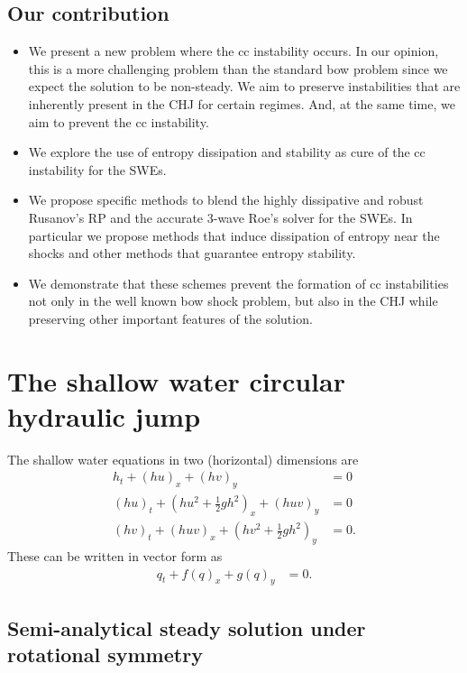 \documentclass[preprint, 11pt]{article}
\begin{document}
\subsection{Our contribution}
\begin{itemize}
\item We present a new problem where the cc instability occurs. In our opinion, this is a more challenging 
  problem than the standard bow problem since we expect the solution to be non-steady. 
  We aim to preserve instabilities that are inherently present in the CHJ for certain regimes. And, 
  at the same time, we aim to prevent the cc instability. 
\item We explore the use of entropy dissipation and stability as cure of the cc instability for the SWEs. 
\item We propose specific methods to blend the highly dissipative and robust Rusanov's RP and the 
  accurate 3-wave Roe's solver for the SWEs. In particular we propose methods that induce dissipation of entropy
  near the shocks and other methods that guarantee entropy stability. 
\item We demonstrate that these schemes prevent the formation of cc instabilities not only 
  in the well known bow shock problem, but also in the CHJ while preserving other important features of 
  the solution. 
\end{itemize}


\section{The shallow water circular hydraulic jump}
The shallow water equations in two (horizontal) dimensions are
\begin{subequations} \label{eq:sw}
\begin{align}
    h_t + (hu)_x + (hv)_y & = 0 \\
    (hu)_t + \left(hu^2 + \frac{1}{2}gh^2\right)_x + (huv)_y & = 0 \\
    (hv)_t + (huv)_x + \left(hv^2 + \frac{1}{2}gh^2\right)_y & = 0.
\end{align}
\end{subequations}
These can be written in vector form as
\begin{align}
    q_t + f(q)_x + g(q)_y & = 0.
\end{align}

\subsection{Semi-analytical steady solution under rotational symmetry}
\end{document}
